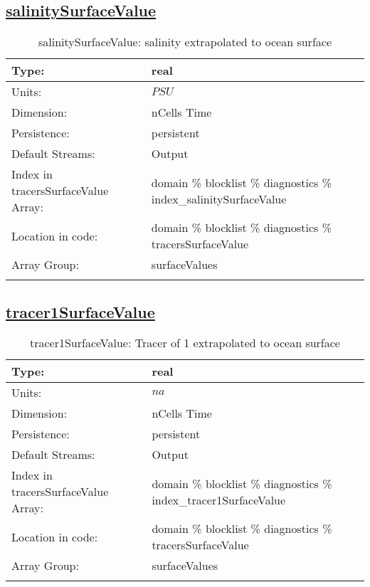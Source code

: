 \subsection[salinitySurfaceValue]{\hyperref[sec:var_tab_diagnostics]{salinitySurfaceValue}}
\label{subsec:var_sec_diagnostics_salinitySurfaceValue}
\begin{center}
\begin{longtable}{| p{2.0in} | p{4.0in} |}
        \hline 
        Type: & real \\
        \hline 
        Units: & $PSU$ \\
        \hline 
        Dimension: & nCells Time \\
        \hline 
        Persistence: & persistent \\
        \hline 
		 Default Streams: & Output  \\
        \hline 
		 Index in tracersSurfaceValue Array: & domain \% blocklist \% diagnostics \% index\_salinitySurfaceValue \\
		 \hline 
		 Location in code: & domain \% blocklist \% diagnostics \% tracersSurfaceValue \\
		 \hline 
		 Array Group: & surfaceValues \\
		 \hline 
    \caption{salinitySurfaceValue: salinity extrapolated to ocean surface}
\end{longtable}
\end{center}
\subsection[tracer1SurfaceValue]{\hyperref[sec:var_tab_diagnostics]{tracer1SurfaceValue}}
\label{subsec:var_sec_diagnostics_tracer1SurfaceValue}
\begin{center}
\begin{longtable}{| p{2.0in} | p{4.0in} |}
        \hline 
        Type: & real \\
        \hline 
        Units: & $na$ \\
        \hline 
        Dimension: & nCells Time \\
        \hline 
        Persistence: & persistent \\
        \hline 
		 Default Streams: & Output  \\
        \hline 
		 Index in tracersSurfaceValue Array: & domain \% blocklist \% diagnostics \% index\_tracer1SurfaceValue \\
		 \hline 
		 Location in code: & domain \% blocklist \% diagnostics \% tracersSurfaceValue \\
		 \hline 
		 Array Group: & surfaceValues \\
		 \hline 
    \caption{tracer1SurfaceValue: Tracer of 1 extrapolated to ocean surface}
\end{longtable}
\end{center}
